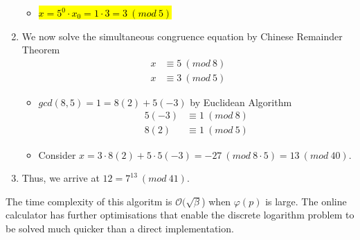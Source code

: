 \documentclass{article}
\begin{document}
\begin{enumerate}
\begin{itemize}
		\item \hl{$x=5^0\cdot x_0=1\cdot 3=3\ (mod\ 5)$}
	\end{itemize}
	
	\item We now solve the simultaneous congruence equation by Chinese Remainder Theorem
	\begin{align}
	x&\equiv5\ (mod\ 8)\\
	x&\equiv3\ (mod\ 5)
	\end{align}
	\begin{itemize}
		\item $gcd(8,5)=1=8(2)+5(-3)$ by Euclidean Algorithm
		\begin{align}
			5(-3)&\equiv1\ (mod\ 8)\\
			8(2)&\equiv1\ (mod\ 5)
		\end{align}
		\item Consider $x=3\cdot8(2)+5\cdot5(-3)=-27\ (mod\ 8\cdot5)=13\ (mod\ 40)$.
	\end{itemize}
	
	\item Thus, we arrive at $12=7^{13}\ (mod\ 41)$.
\end{enumerate}
The time complexity of this algoritm is $\mathcal{O}(\sqrt{\beta}$) when $\varphi(p)$ is large. The online calculator has further optimisations that enable the discrete logarithm problem to be solved much quicker than a direct implementation.
\end{document}
